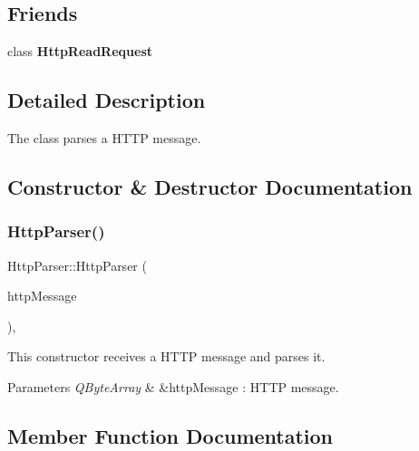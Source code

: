 \subsection*{Friends}
\begin{DoxyCompactItemize}
\item 
\mbox{\label{class_http_parser_a4d54f5003e07e218070a449c22a52c7c}} 
class {\bfseries Http\+Read\+Request}
\end{DoxyCompactItemize}


\subsection{Detailed Description}
The class parses a H\+T\+TP message. 

\subsection{Constructor \& Destructor Documentation}
\mbox{\label{class_http_parser_a91e6c1876337b53694347476f277d1a2}} 
\subsubsection{\texorpdfstring{Http\+Parser()}{HttpParser()}}
{\footnotesize\ttfamily Http\+Parser\+::\+Http\+Parser (\begin{DoxyParamCaption}\item[{Q\+Byte\+Array \&}]{http\+Message }\end{DoxyParamCaption})\hspace{0.3cm}{\ttfamily [inline]}, {\ttfamily [explicit]}}



This constructor receives a H\+T\+TP message and parses it. 


\begin{DoxyParams}{Parameters}
{\em Q\+Byte\+Array} & \&http\+Message \+: H\+T\+TP message. \\
\hline
\end{DoxyParams}


\subsection{Member Function Documentation}
\mbox{\label{class_http_parser_a730d8fa411954d674f602aa385869751}} 
